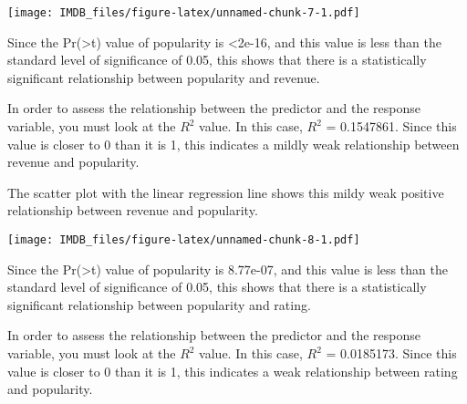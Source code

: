 \documentclass[
]{article}
\newenvironment{Shaded}{\begin{snugshade}}{\end{snugshade}}
\newcommand{\AttributeTok}[1]{\textcolor[rgb]{0.13,0.29,0.53}{#1}}
\newcommand{\FunctionTok}[1]{\textcolor[rgb]{0.13,0.29,0.53}{\textbf{#1}}}
\newcommand{\NormalTok}[1]{#1}
\newcommand{\OtherTok}[1]{\textcolor[rgb]{0.56,0.35,0.01}{#1}}
\newcommand{\SpecialCharTok}[1]{\textcolor[rgb]{0.81,0.36,0.00}{\textbf{#1}}}
\newcommand{\StringTok}[1]{\textcolor[rgb]{0.31,0.60,0.02}{#1}}
\begin{document}
\texttt{[image: IMDB\_files/figure-latex/unnamed-chunk-7-1.pdf]}

Since the Pr(\textgreater\textbar t\textbar) value of popularity is
\textless2e-16, and this value is less than the standard level of
significance of 0.05, this shows that there is a statistically
significant relationship between popularity and revenue.

In order to assess the relationship between the predictor and the
response variable, you must look at the \(R^2\) value. In this case,
\(R^2\) = 0.1547861. Since this value is closer to 0 than it is 1, this
indicates a mildly weak relationship between revenue and popularity.

The scatter plot with the linear regression line shows this mildy weak
positive relationship between revenue and popularity.

\begin{Shaded}
\end{Shaded}

\texttt{[image: IMDB\_files/figure-latex/unnamed-chunk-8-1.pdf]}

Since the Pr(\textgreater\textbar t\textbar) value of popularity is
8.77e-07, and this value is less than the standard level of significance
of 0.05, this shows that there is a statistically significant
relationship between popularity and rating.

In order to assess the relationship between the predictor and the
response variable, you must look at the \(R^2\) value. In this case,
\(R^2\) = 0.0185173. Since this value is closer to 0 than it is 1, this
indicates a weak relationship between rating and popularity.
\end{document}
